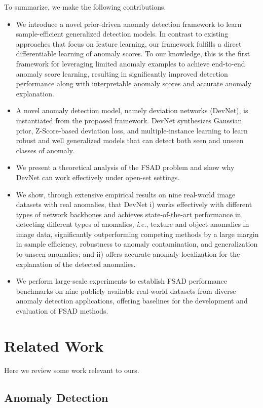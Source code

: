 \documentclass[10pt,journal,compsoc]{IEEEtran}
\newcommand{\ie}{\textit{i.e.}}
\begin{document}
To summarize, we make the following contributions.
\begin{itemize}
    \item We introduce a novel prior-driven anomaly detection framework to learn sample-efficient generalized detection models. In contrast to existing approaches that focus on feature learning, our framework fulfills a direct differentiable learning of anomaly scores. To our knowledge, this is the first framework for leveraging limited anomaly examples to achieve end-to-end anomaly score learning, resulting in significantly improved detection performance along with interpretable anomaly scores and accurate anomaly explanation.
    \item 
    A novel anomaly detection model, namely deviation networks (DevNet), 
    is instantiated from the
    proposed 
    framework. DevNet synthesizes Gaussian prior, Z-Score-based deviation loss, and multiple-instance learning to learn robust and well generalized models that can detect both seen and unseen classes of anomaly. 
    \item We present a theoretical analysis of the FSAD problem and show why DevNet can work effectively under open-set settings.
    \item We show, through extensive empirical results on nine real-world image datasets with real anomalies, that DevNet i) works effectively with different types of network backbones and achieves state-of-the-art performance in detecting different types of anomalies, \ie, texture and object anomalies in image data, significantly outperforming competing methods by a large margin in sample efficiency, robustness to anomaly contamination, and generalization to unseen anomalies; and ii) offers accurate anomaly localization for the explanation of the detected anomalies.
    \item We perform large-scale experiments to establish FSAD performance benchmarks on nine publicly available real-world datasets from diverse anomaly detection applications, offering baselines for the development and evaluation of FSAD methods.
    
\end{itemize}



\section{Related Work}

Here we review some work relevant to ours. 
\subsection{Anomaly Detection}
\end{document}

